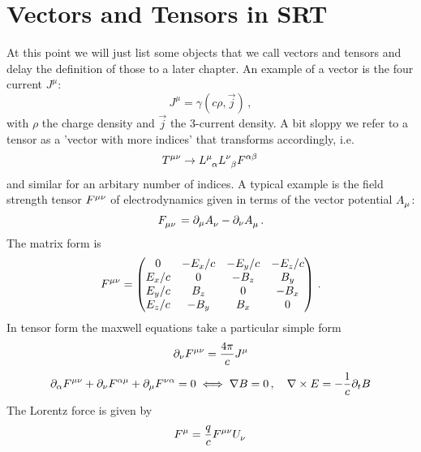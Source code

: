 \section{Vectors and Tensors in SRT} 
At this point we will just list some objects that we call vectors and tensors
and delay the definition of those to a later chapter.
An example of a vector is the four current $J^\mu$:
\begin{equation}
J^\mu=\gamma(c\rho,\vec{j})\, ,
\end{equation}
with $\rho$ the charge density and $\vec{j}$ the 3-current density. A bit sloppy
we refer to a tensor as a 'vector with more indices' that transforms
accordingly, i.e.
\begin{equation}
\tensor{T}{^\mu^\nu}\to
\tensor{L}{^\mu_\alpha}\tensor{L}{^\nu_\beta}\tensor{F}{^\alpha^\beta}\, 
\end{equation}
and similar for an arbitary number of indices. A typical example is the field
strength tensor $\tensor{F}{^\mu^\nu}$ of electrodynamics given in terms of the
vector potential $\tensor{A}{_\mu}$:
\begin{equation}
\tensor{F}{_\mu_\nu}=\partial_\mu\tensor{A}{_\nu}-\partial_\nu\tensor{A}{_\mu}\,
.
\end{equation}
The matrix form is 
\begin{equation}
\tensor{F}{^\mu^\nu}=
\begin{pmatrix}
                  0  &   -E_x/c &  -E_y/c &  -E_z/c \\
                 E_x/c &   0  &  -B_z & B_y \\
                 E_y/c & B_z &   0  &  -B_x \\
                 E_z/c &  -B_y & B_x &   0  \\
\end{pmatrix}\, .
\end{equation}
In tensor form the maxwell equations take a particular simple form
\begin{equation}
\partial_\nu\tensor{F}{^\mu^\nu}=\frac{4\pi}{c}\tensor{J}{^\mu}
\end{equation}
\begin{equation}
\partial_\alpha\tensor{F}{^\mu^\nu}
+\partial_\nu\tensor{F}{^\alpha^\mu}
+\partial_\mu\tensor{F}{^\nu^\alpha}=0
\iff \nabla B=0\, , \quad \nabla\times E=-\frac{1}{c}\partial_t B
\end{equation}
The Lorentz force is given by
\begin{equation}
\tensor{F}{^\mu}=\frac{q}{c}\tensor{F}{^\mu^\nu}\tensor{U}{_\nu}
\end{equation} 
